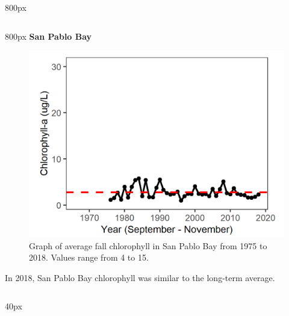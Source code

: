 \documentclass[
]{book}
\begin{document}
\begin{column}{800px\textwidth}
\end{column}

\begin{column}{800px\textwidth}
\textbf{San Pablo Bay}

\begin{figure}
\includegraphics[width=15.25in]{figures/chla_splfall} \caption{Graph of average fall chlorophyll in San Pablo Bay from 1975 to 2018. Values range from 4 to 15.}\label{fig:unnamed-chunk-108}
\end{figure}

In 2018, San Pablo Bay chlorophyll was similar to the long-term average.
\end{column}

\begin{column}{40px\textwidth}
~
\end{column}
\end{document}
